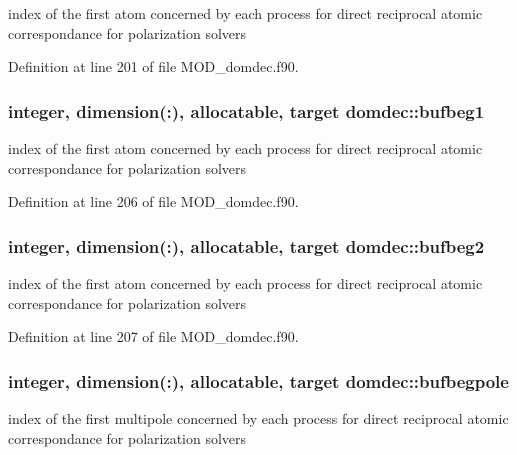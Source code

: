 index of the first atom concerned by each process for direct reciprocal atomic correspondance for polarization solvers 



Definition at line 201 of file M\-O\-D\-\_\-domdec.\-f90.

\hypertarget{classdomdec_a0da0b0f870e5a272cd7af8a6a7b8d393}{
\subsubsection[{bufbeg1}]{\setlength{\rightskip}{0pt plus 5cm}integer, dimension(\-:), allocatable, target domdec\-::bufbeg1}}\label{classdomdec_a0da0b0f870e5a272cd7af8a6a7b8d393}


index of the first atom concerned by each process for direct reciprocal atomic correspondance for polarization solvers 



Definition at line 206 of file M\-O\-D\-\_\-domdec.\-f90.

\hypertarget{classdomdec_a00263858ce6582864a5ed17d590b8e7a}{
\subsubsection[{bufbeg2}]{\setlength{\rightskip}{0pt plus 5cm}integer, dimension(\-:), allocatable, target domdec\-::bufbeg2}}\label{classdomdec_a00263858ce6582864a5ed17d590b8e7a}


index of the first atom concerned by each process for direct reciprocal atomic correspondance for polarization solvers 



Definition at line 207 of file M\-O\-D\-\_\-domdec.\-f90.

\hypertarget{classdomdec_ade41bd5550ac0d2a5a7af786b4a7607e}{
\subsubsection[{bufbegpole}]{\setlength{\rightskip}{0pt plus 5cm}integer, dimension(\-:), allocatable, target domdec\-::bufbegpole}}\label{classdomdec_ade41bd5550ac0d2a5a7af786b4a7607e}


index of the first multipole concerned by each process for direct reciprocal atomic correspondance for polarization solvers 



